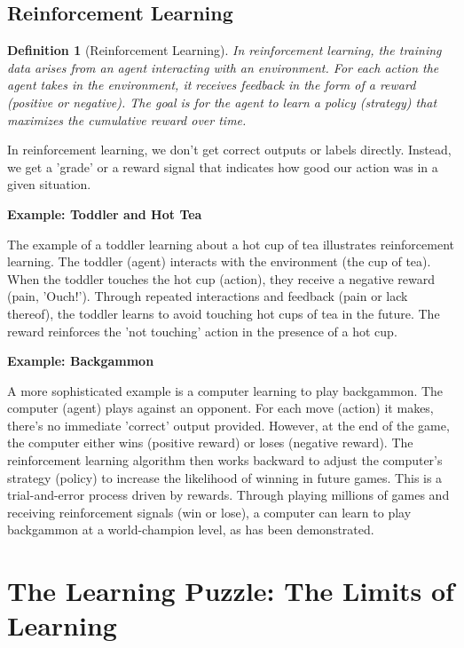 \documentclass{article}
\newtheorem{definition}{Definition}
\begin{document}
\subsection{Reinforcement Learning}

\begin{definition}[Reinforcement Learning]
    In reinforcement learning, the training data arises from an agent interacting with an environment. For each action the agent takes in the environment, it receives feedback in the form of a reward (positive or negative). The goal is for the agent to learn a policy (strategy) that maximizes the cumulative reward over time.
\end{definition}

In reinforcement learning, we don't get correct outputs or labels directly. Instead, we get a 'grade' or a reward signal that indicates how good our action was in a given situation.

\textbf{Example: Toddler and Hot Tea}

The example of a toddler learning about a hot cup of tea illustrates reinforcement learning. The toddler (agent) interacts with the environment (the cup of tea).  When the toddler touches the hot cup (action), they receive a negative reward (pain, 'Ouch!'). Through repeated interactions and feedback (pain or lack thereof), the toddler learns to avoid touching hot cups of tea in the future. The reward reinforces the 'not touching' action in the presence of a hot cup.

\textbf{Example: Backgammon}

A more sophisticated example is a computer learning to play backgammon. The computer (agent) plays against an opponent.  For each move (action) it makes, there's no immediate 'correct' output provided.  However, at the end of the game, the computer either wins (positive reward) or loses (negative reward).  The reinforcement learning algorithm then works backward to adjust the computer's strategy (policy) to increase the likelihood of winning in future games.  This is a trial-and-error process driven by rewards.  Through playing millions of games and receiving reinforcement signals (win or lose), a computer can learn to play backgammon at a world-champion level, as has been demonstrated.

\section{The Learning Puzzle: The Limits of Learning}
\end{document}
